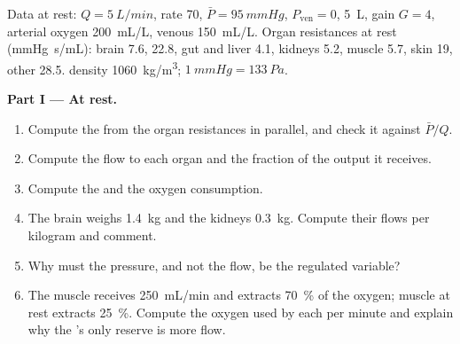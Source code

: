 \begin{problem}
\label{pb:b2:blood-pressure:1}
Data at rest: $Q = \qty{5}{L/min}$, rate 70, $\bar P = \qty{95}{mmHg}$,
$P_{\text{ven}} = 0$,  \qty{5}{L},  gain $G = 4$,
arterial oxygen \qty{200}{mL/L}, venous \qty{150}{mL/L}. Organ
resistances at rest (\unit{mmHg.s/mL}): brain 7.6,  22.8, gut
and liver 4.1, kidneys 5.2, muscle 5.7, skin 19, other 28.5. 
density \qty{1060}{kg/m^3}; $\qty{1}{mmHg} = \qty{133}{Pa}$.

\medskip
\noindent\textbf{Part I --- At rest.}
\begin{enumerate}
  \item Compute the  from the organ
        resistances in parallel, and check it against $\bar P/Q$.
  \item Compute the flow to each organ and the fraction of the output
        it receives.
  \item Compute the  and the oxygen consumption.
  \item The brain weighs \qty{1.4}{kg} and the kidneys \qty{0.3}{kg}.
        Compute their flows per kilogram and comment.
  \item Why must the pressure, and not the flow, be the regulated
        variable?
  \item The  muscle receives \qty{250}{mL/min} and extracts
        \qty{70}{\%} of the oxygen; muscle at rest extracts
        \qty{25}{\%}. Compute the oxygen used by each per minute and
        explain why the 's only reserve is more flow.
\end{enumerate}


\end{problem}
